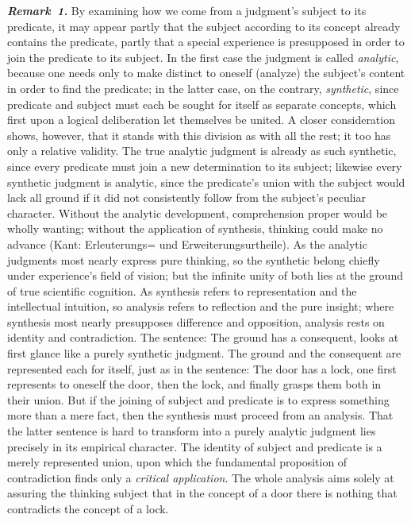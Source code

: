 \documentclass[12pt]{book}
\newcommand{\anm}[1]{\emph{\textbf{Remark~#1.}}}
\begin{document}
\anm{1} By examining how we come from a judgment's subject to its predicate,
it may appear partly that the subject according to its concept already
contains the predicate, partly that a special experience is presupposed in
order to join the predicate to its subject. In the first case the judgment
is called \emph{analytic}, because one needs only to make distinct to
oneself (analyze) the subject's content in order to find the predicate; in
the latter case, on the contrary, \emph{synthetic}, since predicate and
subject must each be sought for itself as separate concepts, which first
upon a logical deliberation let themselves be united. A closer consideration
shows, however, that it stands with this division as with all the rest; it
too has only a relative validity. The true analytic judgment is already as
such synthetic, since every predicate must join a new determination to its
subject; likewise every synthetic judgment is analytic, since the
predicate's union with the subject would lack all ground if it did not
consistently follow from the subject's peculiar character. Without the
analytic development, comprehension proper would be wholly wanting; without
the application of synthesis, thinking could make no advance (Kant:
Erleuterungs= und Erweiterungsurtheile). As the analytic judgments most
nearly express pure thinking, so the synthetic belong chiefly under
experience's field of vision; but the infinite unity of both lies at the
ground of true scientific cognition. As synthesis refers to representation
and the intellectual intuition, so analysis refers to reflection and the
pure insight; where synthesis most nearly presupposes difference and
opposition, analysis rests on identity and contradiction. The sentence: The
ground has a consequent, looks at first glance like a purely synthetic
judgment. The ground and the consequent are represented each for itself,
just as in the sentence: The door has a lock, one first represents to
oneself the door, then the lock, and finally grasps them both in their
union. But if the joining of subject and predicate is to express something
more than a mere fact, then the synthesis must proceed from an analysis.
That the latter sentence is hard to transform into a purely analytic
judgment lies precisely in its empirical character. The identity of subject
and predicate is a merely represented union, upon which the fundamental
proposition of contradiction finds only a \emph{critical application}. The
whole analysis aims solely at assuring the thinking subject that in the
concept of a door there is nothing that contradicts the concept of a lock.
\end{document}
